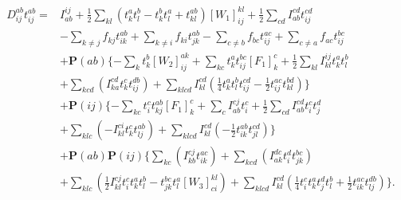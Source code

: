 \documentclass[a4paper,norsk,11pt,twoside]{report}
\begin{document}
\begin{align}
D_{ij}^{ab} t_{ij}^{ab} = & 
I_{ab}^{ij}
+ \frac{1}{2} \sum_{kl} (t_k^a t_l^b - t_k^b t_l^a + t_{kl}^{ab}) [W_1]_{ij}^{kl}
+ \frac{1}{2} \sum_{cd} I_{ab}^{cd} t_{ij}^{cd}
 \nonumber \\ &
- \sum_{k \not= j} f_{kj} t_{ik}^{ab} 
+ \sum_{k \not= i} f_{ki} t_{jk}^{ab}
- \sum_{c \not= b} f_{bc} t_{ij}^{ac}
+ \sum_{c \not= a} f_{ac} t_{ij}^{bc}
 \nonumber \\ &
+ \textbf{P}(ab) 
\{
- \sum_k t_k^b [W_2]_{ij}^{ak}
+ \sum_{kc} t_k^a t_{ij}^{bc} [F_1]_k^c
+ \frac{1}{2} \sum_{kl} I_{kl}^{ij} t_k^a t_l^b 
\nonumber \\ &
+ \sum_{kcd} 
(
I_{ka}^{cd} t_k^c t_{ij}^{db} 
)
+ \sum_{klcd} I_{kl}^{cd} 
(
\frac{1}{4} t_k^a t_l^b t_{ij}^{cd} 
- \frac{1}{2} t_{ij}^{ac} t_{kl}^{bd}
)
\}
\nonumber \\ &
+ \textbf{P}(ij)
\{
- \sum_{kc} t_i^c t_{kj}^{ab} [F_1]_k^c
+ \sum_c I_{ab}^{cj} t_i^c
+ \frac{1}{2} \sum_{cd} I_{ab}^{cd} t_i^c t_j^d 
\nonumber \\ &
+ \sum_{klc}
( 
- I_{kl}^{ci} t_k^c t_{lj}^{ab}
)
+ \sum_{klcd} I_{kl}^{cd}
(
- \frac{1}{2} t_{ik}^{ab} t_{jl}^{cd}
)
\}
\nonumber \\ &
+ \textbf{P}(ab) \textbf{P}(ij)
\{
\sum_{kc}
(
I_{kb}^{cj} t_{ik}^{ac}
)
+ \sum_{kcd}
(
I_{ak}^{dc} t_i^d t_{jk}^{bc}
)
\nonumber \\ &
+ \sum_{klc}
(
\frac{1}{2} I_{kl}^{cj} t_i^c t_k^a t_l^b
- t_{jk}^{bc} t_l^a [W_3]_{ci}^{kl}
)
+ \sum_{klcd} I_{kl}^{cd}
(
\frac{1}{4} t_i^c t_k^a t_j^d t_l^b
+ \frac{1}{2} t_{ik}^{ac} t_{lj}^{db} 
)
\} .
\end{align}
\end{document}
